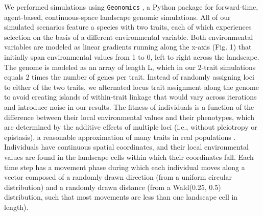 \documentclass[9pt,twocolumn,twoside,lineno]{new_article}
\begin{document}
We performed simulations using \texttt{Geonomics} \cite{terasaki_hart},
a Python \cite{rossum} package for forward-time, agent-based, continuous-space landscape genomic simulations.
All of our simulated scenarios feature
a species with two traits, each of which experiences 
selection on the basis of a different environmental variable.
Both environmental variables are modeled as linear gradients running along the x-axis (Fig. 1)
that initially span environmental values from 1 to 0, left to right across the landscape.
The genome is modeled as an array of length L,
which in our 2-trait simulations equals 2 times the number of genes per trait.
Instead of randomly assigning loci to either of the two traits,
we alternated locus trait assignment along the genome
to avoid creating islands of within-trait linkage
that would vary across iterations and introduce noise in our results.
The fitness of individuals is a function of the difference between their local
environmental values and their phenotypes, which are determined by the
additive effects of multiple loci (i.e., without pleiotropy or epistasis), a reasonable approximation of many traits in real populations \cite{sella}.
Individuals have continuous spatial coordinates, and their local environmental values are found in the landscape cells within which their coordinates fall.
Each time step has a movement phase during which each individual moves along a vector composed of a randomly drawn direction
(from a uniform circular distribution) and a randomly drawn distance
(from a Wald(0.25, 0.5) distribution, such that most movements are less than one landscape cell in length).
\end{document}
